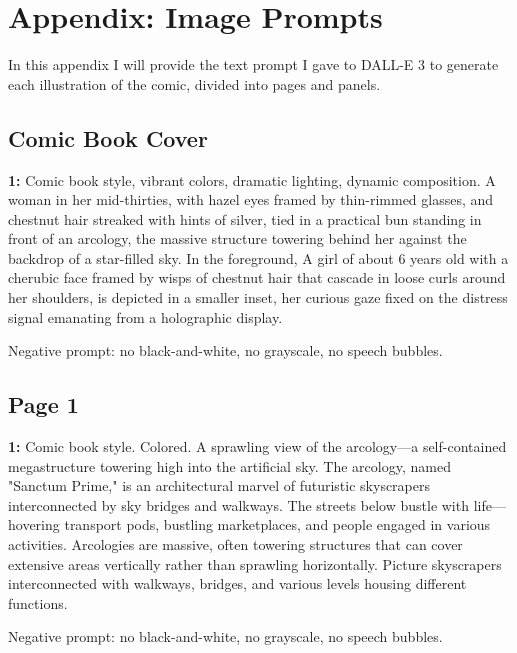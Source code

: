 \section{Appendix: Image Prompts}

In this appendix I will provide the text prompt I gave to DALL-E 3 to generate each illustration of the comic, divided into pages and panels.

\subsection*{Comic Book Cover}
\begin{iquote}
    \textbf{1:} Comic book style, vibrant colors, dramatic lighting, dynamic composition. A woman in her mid-thirties, with hazel eyes framed by thin-rimmed glasses, and chestnut hair streaked with hints of silver, tied in a practical bun standing in front of an arcology, the massive structure towering behind her against the backdrop of a star-filled sky. In the foreground, A girl of about 6 years old with a cherubic face framed by wisps of chestnut hair that cascade in loose curls around her shoulders, is depicted in a smaller inset, her curious gaze fixed on the distress signal emanating from a holographic display.

    \noindent Negative prompt: no black-and-white, no grayscale, no speech bubbles.
\end{iquote}


\subsection*{Page 1}
\begin{iquote}
    \textbf{1:} Comic book style. Colored. A sprawling view of the arcology—a self-contained megastructure towering high into the artificial sky. The arcology, named "Sanctum Prime," is an architectural marvel of futuristic skyscrapers interconnected by sky bridges and walkways. The streets below bustle with life—hovering transport pods, bustling marketplaces, and people engaged in various activities. Arcologies are massive, often towering structures that can cover extensive areas vertically rather than sprawling horizontally. Picture skyscrapers interconnected with walkways, bridges, and various levels housing different functions. 

    \noindent Negative prompt: no black-and-white, no grayscale, no speech bubbles.
\end{iquote}


